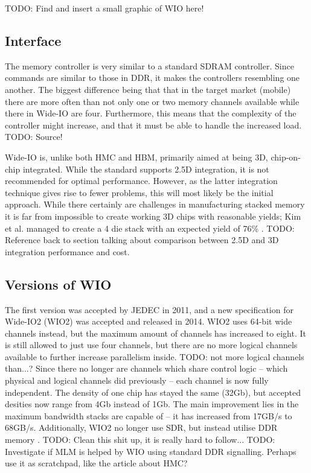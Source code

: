 TODO: Find and insert a small graphic of WIO here!

\subsection{Interface}
The memory controller is very similar to a standard SDRAM controller. Since commands are similar to those in DDR, it makes the controllers resembling one another. The biggest difference being that that in the target market (mobile) there are more often than not only one or two memory channels available while there in Wide-IO are four. Furthermore, this means that the complexity of the controller might increase, and that it must be able to handle the increased load. TODO: Source!
\bigskip

Wide-IO is, unlike both HMC and HBM, primarily aimed at being 3D, chip-on-chip integrated. While the standard supports 2.5D integration, it is not recommended for optimal performance. However, as the latter integration technique gives rise to fewer problems, this will most likely be the initial approach. While there certainly are challenges in manufacturing stacked memory it is far from impossible to create working 3D chips with reasonable yields; Kim et al. managed to create a 4 die stack with an expected yield of 76\% \cite{kim20121}. TODO: Reference back to section talking about comparison between 2.5D and 3D integration performance and cost.

\subsection{Versions of WIO}
The first version was accepted by JEDEC in 2011, and a new specification for Wide-IO2 (WIO2) was accepted and released in 2014. WIO2 uses 64-bit wide channels instead, but the maximum amount of channels has increased to eight. It is still allowed to just use four channels, but there are no more logical channels available to further increase parallelism inside. TODO: not more logical channels than...? Since there no longer are channels which share control logic -- which physical and logical channels did previously -- each channel is now fully independent. The density of one chip has stayed the same (32Gb), but accepted desities now range from 4Gb instead of 1Gb. The main improvement lies in the maximum bandwidth stacks are capable of -- it has increased from 17GB/s to 68GB/s. Additionally, WIO2 no longer use SDR, but instead utilise DDR memory \cite{standard2014wide}. TODO: Clean this shit up, it is really hard to follow...
TODO: Investigate if MLM is helped by WIO using standard DDR signalling. Perhaps use it as scratchpad, like the article about HMC? 

